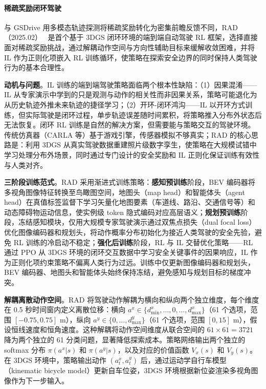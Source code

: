 \paragraph{稀疏奖励闭环驾驶}

与 GSDrive 用多模态轨迹探测将稀疏奖励转化为密集前瞻反馈不同，RAD（2025.02）~\cite{2502_13144} 是首个基于 3DGS 闭环环境的端到端自动驾驶 RL 框架，选择直接面对稀疏奖励挑战，通过解耦动作空间与方向性辅助目标来缓解收敛困难，并将 IL 作为正则化项嵌入 RL 训练循环，使策略在探索安全边界的同时保持人类驾驶行为的基本合理性。

\textbf{动机与问题}。IL 训练的端到端驾驶策略面临两个根本性缺陷：（1）因果混淆——IL 从专家演示中学到的只是观测与动作的相关性而非因果关系，策略可能退化为从历史轨迹外推未来轨迹的捷径学习；（2）开环-闭环鸿沟——IL 以开环方式训练，但实际驾驶是闭环过程，单步轨迹误差随时间累积，将策略推入分布外状态后无法恢复。闭环 RL 训练是自然的解决方案，但需要能与策略交互的驾驶环境。传统仿真器（CARLA 等）基于游戏引擎，传感器模拟不够真实；RAD 的核心思路是：利用 3DGS 从真实驾驶数据重建照片级数字孪生，使策略在大规模试错中学习处理分布外场景，同时通过专门设计的安全奖励和 IL 正则化保证训练有效性与人类对齐。

\textbf{三阶段训练范式}。RAD 采用渐进式训练策略：\textbf{感知预训练}阶段，BEV 编码器将多视角图像特征转换至鸟瞰图空间，地图头（map head）和智能体头（agent head）在真值标签监督下学习矢量化地图要素（车道线、路沿、交通信号等）和动态障碍物运动信息，使实例级 token 隐式编码对应高层语义；\textbf{规划预训练}阶段，冻结感知模块，仅用大规模专家驾驶演示通过双焦点损失（dual focal loss）优化图像编码器和规划头，将动作概率分布初始化为接近人类驾驶的安全先验，避免 RL 训练的冷启动不稳定；\textbf{强化后训练}阶段，RL 与 IL 交替优化策略——RL 通过 PPO 从 3DGS 环境的闭环交互数据中学习安全关键事件的因果响应，IL 作为正则化项约束策略不偏离人类行为过远。训练中仅更新图像编码器和规划头，BEV 编码器、地图头和智能体头始终保持冻结，避免感知与规划目标的梯度冲突。

\textbf{解耦离散动作空间}。RAD 将驾驶动作解耦为横向和纵向两个独立维度，每个维度在 0.5 秒时间窗内定义离散位移：横向 $a^x \in \{d^x_{\min}, \ldots, 0, \ldots, d^x_{\max}\}$（61 个选项，范围 $[-0.75, 0.75]$ m），纵向 $a^y \in \{0, \ldots, d^y_{\max}\}$（61 个选项，范围 $[0, 15]$ m），假设恒线速度和恒角速度。这种解耦将动作空间维度从联合空间的 $61 \times 61 = 3721$ 降为两个独立的 61 分类问题，显著降低探索成本。策略网络输出两个独立的 softmax 分布 $\pi(a^x|s)$ 和 $\pi(a^y|s)$，以及对应的价值函数 $V_x(s)$ 和 $V_y(s)$。在 3DGS 环境中，策略输出动作 $(a^x_t, a^y_t)$ 后，通过运动学自行车模型（kinematic bicycle model）更新自车位姿，3DGS 环境根据新位姿渲染多视角图像作为下一步输入。

